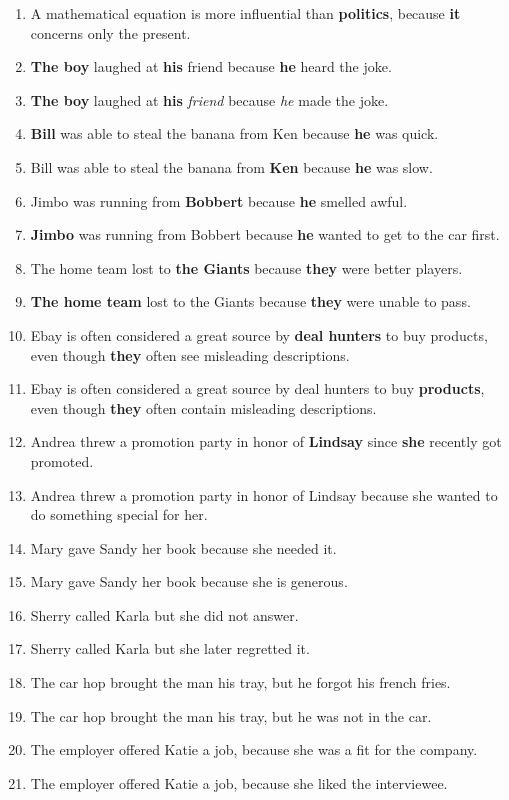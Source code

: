 \documentclass{article}
\begin{document}
\begin{enumerate}
	\item A mathematical equation is more influential than {\bf politics}, because {\bf it} concerns only the present.
	\item {\bf The boy} laughed at {\bf his} friend because {\bf he} heard the joke.
	\item {\bf The boy} laughed at {\bf his} {\it friend} because {\it he} made the joke.
	\item {\bf Bill} was able to steal the banana from Ken because {\bf he} was quick.
	\item Bill was able to steal the banana from {\bf Ken} because {\bf he} was slow.
	\item Jimbo was running from {\bf Bobbert} because {\bf he} smelled awful.
	\item {\bf Jimbo} was running from Bobbert because {\bf he} wanted to get to the car first.
	\item The home team lost to {\bf the Giants} because {\bf they} were better players.
	\item {\bf The home team} lost to the Giants because {\bf they} were unable to pass.
	\item Ebay is often considered a great source by {\bf deal hunters} to buy products, even though {\bf they} often see misleading descriptions.
	\item Ebay is often considered a great source by deal hunters to buy {\bf products}, even though {\bf they} often contain misleading descriptions.
	\item Andrea threw a promotion party in honor of {\bf Lindsay} since {\bf she} recently got promoted.
	\item Andrea threw a promotion party in honor of Lindsay because she wanted to do something special for her.
	\item Mary gave Sandy her book because she needed it.
	\item Mary gave Sandy her book because she is generous.
	\item Sherry called Karla but she did not answer.
	\item Sherry called Karla but she later regretted it.
	\item The car hop brought the man his tray, but he forgot his french fries.
	\item The car hop brought the man his tray, but he was not in the car.
	\item The employer offered Katie a job, because she was a fit for the company.
	\item The employer offered Katie a job, because she liked the interviewee.

\end{enumerate}
\end{document}
